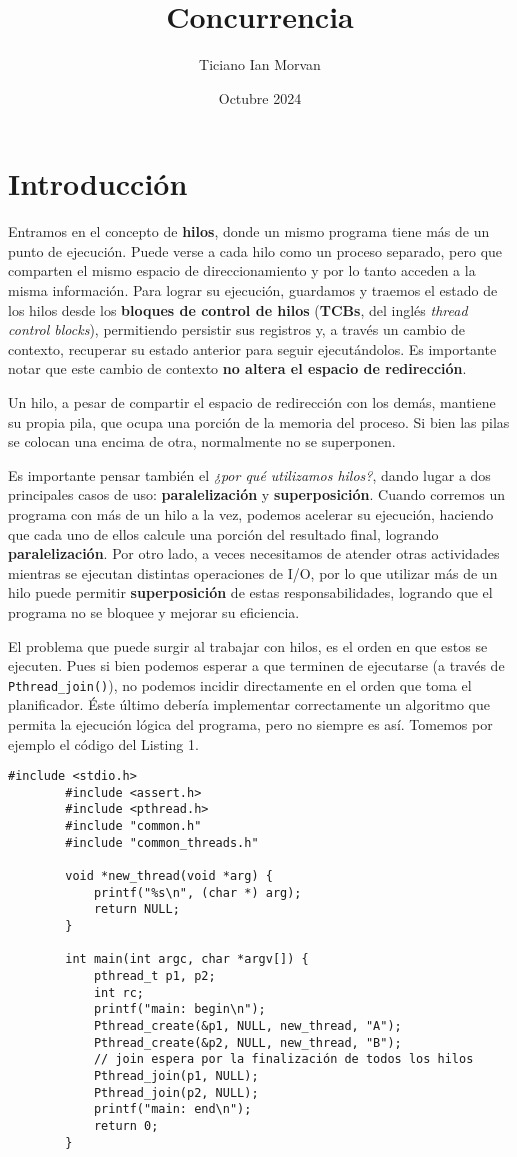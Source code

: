 \documentclass{article}
\title{Concurrencia}
\author{Ticiano Ian Morvan}
\date{Octubre 2024}
\begin{document}
	\maketitle
	
	\section{Introducción}
	Entramos en el concepto de \textbf{hilos}, donde un mismo programa tiene más de un punto de ejecución. Puede verse a cada hilo como un proceso separado, pero que comparten el mismo espacio de direccionamiento y por lo tanto acceden a la misma información. Para lograr su ejecución, guardamos y traemos el estado de los hilos desde los \textbf{bloques de control de hilos} (\textbf{TCBs}, del inglés \textit{thread control blocks}), permitiendo persistir sus registros y, a través un cambio de contexto, recuperar su estado anterior para seguir ejecutándolos. Es importante notar que este cambio de contexto \textbf{no altera el espacio de redirección}.

	Un hilo, a pesar de compartir el espacio de redirección con los demás, mantiene su propia pila, que ocupa una porción de la memoria del proceso. Si bien las pilas se colocan una encima de otra, normalmente no se superponen.
	
	Es importante pensar también el \textit{¿por qué utilizamos hilos?}, dando lugar a dos principales casos de uso: \textbf{paralelización} y \textbf{superposición}. Cuando corremos un programa con más de un hilo a la vez, podemos acelerar su ejecución, haciendo que cada uno de ellos calcule una porción del resultado final, logrando \textbf{paralelización}. Por otro lado, a veces necesitamos de atender otras actividades mientras se ejecutan distintas operaciones de I/O, por lo que utilizar más de un hilo puede permitir \textbf{superposición} de estas responsabilidades, logrando que el programa no se bloquee y mejorar su eficiencia.
	
	El problema que puede surgir al trabajar con hilos, es el orden en que estos se ejecuten. Pues si bien podemos esperar a que terminen de ejecutarse (a través de \lstinline|Pthread_join()|), no podemos incidir directamente en el orden que toma el planificador. Éste último debería implementar correctamente un algoritmo que permita la ejecución lógica del programa, pero no siempre es así. Tomemos por ejemplo el código del Listing 1.	
	\pagebreak
	
	\begin{lstlisting}[caption={Creación de hilos en C}]
		#include <stdio.h>
		#include <assert.h>
		#include <pthread.h>
		#include "common.h"
		#include "common_threads.h"
		
		void *new_thread(void *arg) {
			printf("%s\n", (char *) arg);
			return NULL;
		}
	
		int main(int argc, char *argv[]) {
			pthread_t p1, p2;
			int rc;
			printf("main: begin\n");
			Pthread_create(&p1, NULL, new_thread, "A");
			Pthread_create(&p2, NULL, new_thread, "B");
			// join espera por la finalización de todos los hilos
			Pthread_join(p1, NULL);
			Pthread_join(p2, NULL);
			printf("main: end\n");
			return 0;
		}
	\end{lstlisting}
\end{document}
